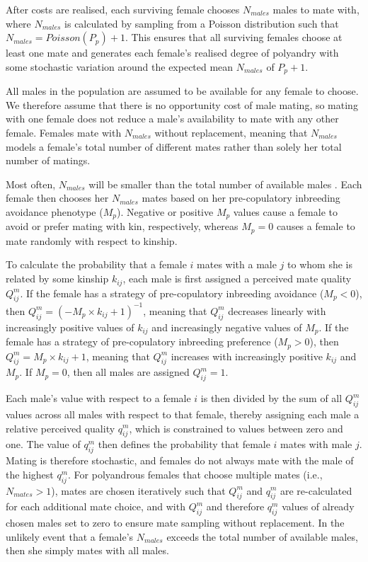 \documentclass[12pt]{article}
\begin{document}
After costs are realised, each surviving female chooses $N_{males}$ males to mate with, where $N_{males}$ is calculated by sampling from a Poisson distribution such that $N_{males} = Poisson(P_{p}) + 1$. This ensures that all surviving females choose at least one mate and generates each female's realised degree of polyandry with some stochastic variation around the expected mean $N_{males}$ of $P_{p}+1$. 

All males in the population are assumed to be available for any female to choose. We therefore assume that there is no opportunity cost of male mating, so mating with one female does not reduce a male's availability to mate with any other female. Females mate with $N_{males}$ without replacement, meaning that $N_{males}$ models a female's total number of different mates rather than solely her total number of matings.

Most often, $N_{males}$ will be smaller than the total number of available males \cite[][]{Duthie}. Each female then chooses her $N_{males}$ mates based on her pre-copulatory inbreeding avoidance phenotype ($M_{p}$). Negative or positive $M_{p}$ values cause a female to avoid or prefer mating with kin, respectively, whereas $M_{p}=0$ causes a female to mate randomly with respect to kinship.

To calculate the probability that a female $i$ mates with a male $j$ to whom she is related by some kinship $k_{ij}$, each male is first assigned a perceived mate quality $Q^{m}_{ij}$. If the female has a strategy of pre-copulatory inbreeding avoidance ($M_{p}<0$), then $Q^{m}_{ij} = (-M_{p} \times k_{ij} + 1)^{-1}$, meaning that $Q^{m}_{ij}$ decreases linearly with increasingly positive values of $k_{ij}$ and increasingly negative values of $M_{p}$. If the female has a strategy of pre-copulatory inbreeding preference ($M_{p}>0$), then $Q^{m}_{ij} = M_{p} \times k_{ij} + 1$, meaning that $Q^{m}_{ij}$ increases with increasingly positive $k_{ij}$ and $M_{p}$. If $M_{p}=0$, then all males are assigned $Q^{m}_{ij}=1$.

Each male's value with respect to a female $i$ is then divided by the sum of all $Q^{m}_{ij}$ values across all males with respect to that female, thereby assigning each male a relative perceived quality $q^{m}_{ij}$, which is constrained to values between zero and one. The value of $q^{m}_{ij}$ then defines the probability that female $i$ mates with male $j$. Mating is therefore stochastic, and females do not always mate with the male of the highest $q^{m}_{ij}$. For polyandrous females that choose multiple mates (i.e., $N_{mates}>1$), mates are chosen iteratively such that $Q^{m}_{ij}$ and $q^{m}_{ij}$ are re-calculated for each additional mate choice, and with $Q^{m}_{ij}$ and therefore $q^{m}_{ij}$ values of already chosen males set to zero to ensure mate sampling without replacement. In the unlikely event that a female's $N_{males}$ exceeds the total number of available males, then she simply mates with all males.
\end{document}
